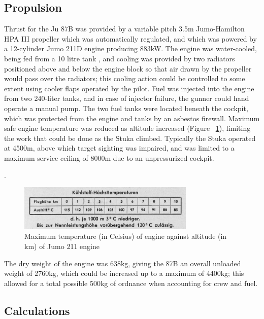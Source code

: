 \documentclass[a4paper, fontsize=11pt]{scrartcl} %
\begin{document}
\subsection{Propulsion}
Thrust for the Ju 87B was provided by a variable pitch 3.5m
Jumo-Hamilton HPA III propeller which was automatically regulated, and
which was powered by a 12-cylinder Jumo 211D engine producing 883kW. The engine
was water-cooled, being fed from a 10 litre tank
\autocite[p~.7]{manual41}, and cooling was provided by two radiators
positioned above and below the engine block so that air drawn by the
propeller would pass over the radiators; this cooling action could be
controlled to some extent using cooler flaps operated by the pilot. Fuel
was injected into the engine from two 240-liter tanks, and in case of
injector failure, the gunner could hand operate a manual pump. The two
fuel tanks were located beneath the cockpit, which was protected from
the engine and tanks by an asbestos firewall. Maximum safe engine temperature
was reduced as altitude increased (Figure ~\ref{fig:temp}), limiting the
work that could be done as the Stuka climbed. Typically the Stuka
operated at 4500m, above which target sighting was impaired, and
was limited to a maximum service ceiling of 8000m due to an unpressurized cockpit.

\autocite[p~.16]{guardia14}.
\begin{figure}[h]
  \centering
  \includegraphics[width=0.75\textwidth]{media/temperature}
  \caption{Maximum temperature (in Celsius) of engine against altitude
    (in km) of Jumo 211 engine \autocite[p~.11]{manual41}}
  \label{fig:temp}
\end{figure}
The dry weight of the engine was 638kg, giving the 87B an overall unloaded
weight of 2760kg, which could be increased up to a maximum of 4400kg;
this allowed for a total possible 500kg of ordnance when accounting for
crew and fuel.
\subsection{Calculations}
\end{document}
